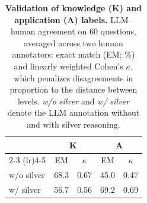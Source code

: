 \begin{table}[t]
    \centering
    \small
    \caption{\textbf{Validation of knowledge (K) and application (A) labels.} LLM--human agreement on 60 questions, averaged across two human annotators: exact match (EM; \%) and linearly weighted Cohen's $\kappa$, which penalizes disagreements in proportion to the distance between levels. \textit{w/o silver} and \textit{w/ silver} denote the LLM annotation without and with silver reasoning.}
    \label{tab:ka_val}

    \begin{tabular}{l|cc|cc}
        \toprule[1.5pt]
        & \multicolumn{2}{c|}{\textbf{K}} & \multicolumn{2}{c}{\textbf{A}} \\
        \cmidrule(lr){2-3} \cmidrule(lr){4-5}
        & EM & $\kappa$ & EM & $\kappa$ \\
        \midrule[1pt]
        w/o silver & 68.3 & 0.67 & 45.0 & 0.47 \\
        \rowcolor[HTML]{D9D9D9}
        w/ silver & 56.7 & 0.56 & 69.2 & 0.69 \\
        \bottomrule[1.5pt]
    \end{tabular}
    \vspace{-0.1in}
\end{table}